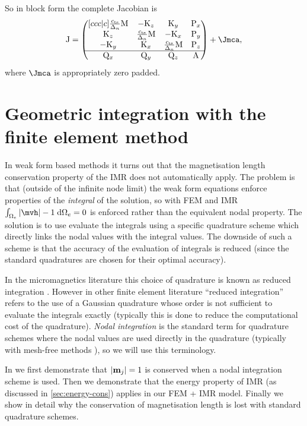 So in block form the complete Jacobian is
\begin{equation}
  \Jm =
  \begin{pmatrix}[ccc|c]
    \jts \Mm    & -\Km_z       & \Km_y      & \Pm_x \\
    \Km_z         & \jts\Mm    & -\Km_x     & \Pm_y \\
    -\Km_y        & \Km_x      & \jts \Mm & \Pm_z \\
    \hline
    \Qm_x       & \Qm_y      & \Qm_z    & \Am     \\
  \end{pmatrix} + \Jmca,
  \label{eq:full-monolithic-jac}
\end{equation}
where $\Jmca$ is appropriately zero padded.



\section{Geometric integration with the finite element method}
\label{sec:nodal-integration}

In weak form based methods it turns out that the magnetisation length conservation property of the IMR does not automatically apply.
The problem is that (outside of the infinite node limit) the weak form equations enforce properties of the \emph{integral} of the solution, so with FEM and IMR $\int_{\magd_e} \abs{\mvh} -1 \d\magd_e = 0$ is enforced rather than the equivalent nodal property.
The solution is to use evaluate the integrals using a specific quadrature scheme which directly links the nodal values with the integral values.
The downside of such a scheme is that the accuracy of the evaluation of integrals is reduced (since the standard quadratures are chosen for their optimal accuracy).

In the micromagnetics literature this choice of quadrature is known as reduced integration \cite{Cimrak2008}.
However in other finite element literature ``reduced integration'' refers to the use of a Gaussian quadrature whose order is not sufficient to evaluate the integrals exactly (typically this is done to reduce the computational cost of the quadrature).
\emph{Nodal integration} is the standard term for quadrature schemes where the nodal values are used directly in the quadrature (typically with mesh-free methods \eg \cite{Puso2008}), so we will use this terminology.

In  we first demonstrate that $\left|{\boldsymbol{\mathrm{m}}_j} \right|=1$ is conserved when a nodal integration scheme is used.
Then we demonstrate that the energy property of IMR (as discussed in \cref{sec:energy-cons}) applies in our FEM + IMR model.
Finally we show in detail why the conservation of magnetisation length is lost with standard quadrature schemes.


